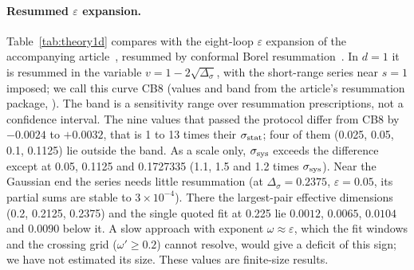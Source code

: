 \documentclass[10pt,a4paper]{article}
\newcommand{\Ds}{\Delta_\sigma}
\newcommand{\sstat}{\sigma_{\rm stat}}
\newcommand{\ssys}{\sigma_{\rm sys}}
\begin{document}
\paragraph{Resummed $\varepsilon$ expansion.} Table~\ref{tab:theory1d} compares with the eight-loop $\varepsilon$ expansion of the accompanying
article~\cite{Zheng:2026ai}, resummed by conformal Borel resummation~\cite{LeGuillou:1979ixc}. In $d=1$ it is resummed in the variable
$v=1-2\sqrt{\Ds}$, with the short-range series near $s=1$ imposed; we call this curve CB8 (values and band from the article's resummation
package, ). The band is a sensitivity range over resummation prescriptions, not a confidence interval.
The nine values that passed the protocol differ from CB8 by $-0.0024$ to $+0.0032$, that is 1 to 13 times their $\sstat$; four of them (0.025,
0.05, 0.1, 0.1125) lie outside the band. As a scale only, $\ssys$ exceeds the difference except at 0.05, 0.1125 and 0.1727335 (1.1, 1.5 and 1.2
times $\ssys$). Near the Gaussian end the series needs little resummation (at $\Ds=0.2375$, $\varepsilon=0.05$, its partial sums are stable to
$3\times10^{-4}$). There the largest-pair effective dimensions (0.2, 0.2125, 0.2375) and the single quoted fit at 0.225 lie $0.0012$,
$0.0065$, $0.0104$ and $0.0090$ below it. A slow approach with exponent $\omega\approx\varepsilon$, which the fit windows and the crossing grid
($\omega'\ge0.2$) cannot resolve, would give a deficit of this sign; we have not estimated its size. These values are finite-size results.
\end{document}
